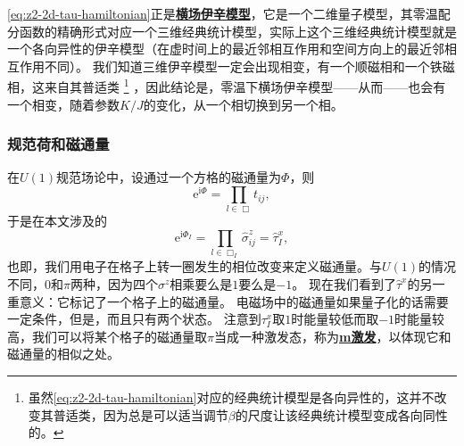 \documentclass[hyperref, UTF8, a4paper]{ctexart}
\newcommand*{\ii}{\mathrm{i}}
\newcommand*{\ee}{\mathrm{e}}
\newcommand*{\concept}[1]{\underline{\textbf{#1}}}
\newcommand*{\Ztwo}{$\mathbb{Z}_2$}
\begin{document}
\eqref{eq:z2-2d-tau-hamiltonian}正是\concept{横场伊辛模型}，它是一个二维量子模型，其零温配分函数的精确形式对应一个三维经典统计模型，实际上这个三维经典统计模型就是一个各向异性的伊辛模型（在虚时间上的最近邻相互作用和空间方向上的最近邻相互作用不同）。
我们知道三维伊辛模型一定会出现相变，有一个顺磁相和一个铁磁相，这来自其普适类%
\footnote{
    虽然\eqref{eq:z2-2d-tau-hamiltonian}对应的经典统计模型是各向异性的，这并不改变其普适类，因为总是可以适当调节$\beta$的尺度让该经典统计模型变成各向同性的。
}%
，因此结论是，零温下横场伊辛模型——从而——也会有一个相变，随着参数$K / J$的变化，从一个相切换到另一个相。

\subsubsection{规范荷和磁通量}

在$U(1)$规范场论中，设通过一个方格的磁通量为$\Phi$，则
\[
    \ee^{\ii \Phi} = \prod_{l \in \Box} t_{ij},
\]
于是在本文涉及的
\begin{equation}
    \ee^{\ii \Phi_I} = \prod_{l \in \Box_I} \hat{\sigma}^z_{ij} = \hat{\tau}^x_I,
\end{equation}
也即，我们用电子在格子上转一圈发生的相位改变来定义磁通量。与$U(1)$的情况不同，$0$和$\pi$两种，因为四个$\sigma^z$相乘要么是$1$要么是$-1$。
现在我们看到了$\hat{\tau}^x$的另一重意义：它标记了一个格子上的磁通量。
电磁场中的磁通量如果量子化的话需要一定条件，但是，而且只有两个状态。
注意到$\tau_I^x$取$1$时能量较低而取$-1$时能量较高，我们可以将某个格子的磁通量取$\pi$当成一种激发态，称为\concept{m激发}，以体现它和磁通量的相似之处。
\end{document}
